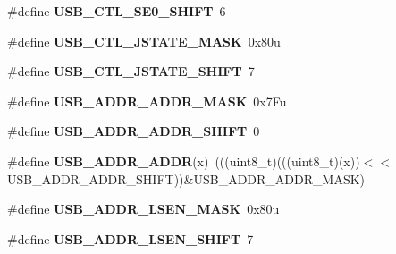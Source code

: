 \begin{DoxyCompactItemize}
\item 
\#define {\bfseries U\+S\+B\+\_\+\+C\+T\+L\+\_\+\+S\+E0\+\_\+\+S\+H\+I\+FT}~6\hypertarget{group__USB__Register__Masks_gaa3a02fa6ec226d10d54353456d44fa88}{}\label{group__USB__Register__Masks_gaa3a02fa6ec226d10d54353456d44fa88}

\item 
\#define {\bfseries U\+S\+B\+\_\+\+C\+T\+L\+\_\+\+J\+S\+T\+A\+T\+E\+\_\+\+M\+A\+SK}~0x80u\hypertarget{group__USB__Register__Masks_ga3a56395d81066c161d523479ed340907}{}\label{group__USB__Register__Masks_ga3a56395d81066c161d523479ed340907}

\item 
\#define {\bfseries U\+S\+B\+\_\+\+C\+T\+L\+\_\+\+J\+S\+T\+A\+T\+E\+\_\+\+S\+H\+I\+FT}~7\hypertarget{group__USB__Register__Masks_gad553773ca9a02b344ab10269c999d143}{}\label{group__USB__Register__Masks_gad553773ca9a02b344ab10269c999d143}

\item 
\#define {\bfseries U\+S\+B\+\_\+\+A\+D\+D\+R\+\_\+\+A\+D\+D\+R\+\_\+\+M\+A\+SK}~0x7\+Fu\hypertarget{group__USB__Register__Masks_ga7ccfd8bde2bb3831d13280315df4501c}{}\label{group__USB__Register__Masks_ga7ccfd8bde2bb3831d13280315df4501c}

\item 
\#define {\bfseries U\+S\+B\+\_\+\+A\+D\+D\+R\+\_\+\+A\+D\+D\+R\+\_\+\+S\+H\+I\+FT}~0\hypertarget{group__USB__Register__Masks_ga57c7c394504da946dae75d5b20a2f297}{}\label{group__USB__Register__Masks_ga57c7c394504da946dae75d5b20a2f297}

\item 
\#define {\bfseries U\+S\+B\+\_\+\+A\+D\+D\+R\+\_\+\+A\+D\+DR}(x)~(((uint8\+\_\+t)(((uint8\+\_\+t)(x))$<$$<$U\+S\+B\+\_\+\+A\+D\+D\+R\+\_\+\+A\+D\+D\+R\+\_\+\+S\+H\+I\+FT))\&U\+S\+B\+\_\+\+A\+D\+D\+R\+\_\+\+A\+D\+D\+R\+\_\+\+M\+A\+SK)\hypertarget{group__USB__Register__Masks_gad42e50014eedee91315521b19199ef39}{}\label{group__USB__Register__Masks_gad42e50014eedee91315521b19199ef39}

\item 
\#define {\bfseries U\+S\+B\+\_\+\+A\+D\+D\+R\+\_\+\+L\+S\+E\+N\+\_\+\+M\+A\+SK}~0x80u\hypertarget{group__USB__Register__Masks_ga695e1ebe159d45ecd94fe40627ac121e}{}\label{group__USB__Register__Masks_ga695e1ebe159d45ecd94fe40627ac121e}

\item 
\#define {\bfseries U\+S\+B\+\_\+\+A\+D\+D\+R\+\_\+\+L\+S\+E\+N\+\_\+\+S\+H\+I\+FT}~7\hypertarget{group__USB__Register__Masks_ga7c81adb1ac1c658006ea0ebfd4644634}{}\label{group__USB__Register__Masks_ga7c81adb1ac1c658006ea0ebfd4644634}


\end{DoxyCompactItemize}
